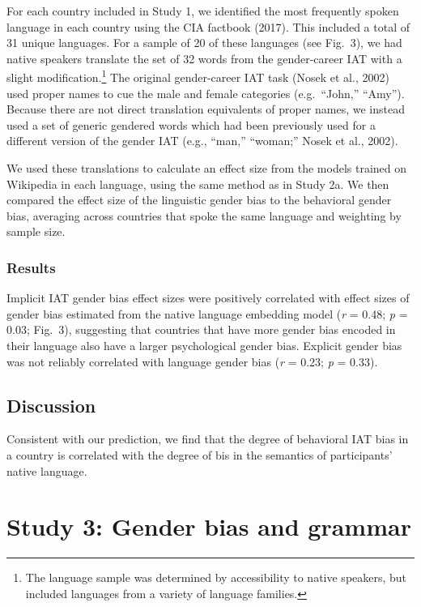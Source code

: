 \documentclass[10pt, letterpaper]{article}
\begin{document}
For each country included in Study 1, we identified the most frequently
spoken language in each country using the CIA factbook (2017). This
included a total of 31 unique languages. For a sample of 20 of these
languages (see Fig.~3), we had native speakers translate the set of 32
words from the gender-career IAT with a slight
modification.\footnote{The language sample was determined by accessibility to native speakers, but included languages from a variety of language families.}
The original gender-career IAT task (Nosek et al., 2002) used proper
names to cue the male and female categories (e.g.~``John,'' ``Amy'').
Because there are not direct translation equivalents of proper names, we
instead used a set of generic gendered words which had been previously
used for a different version of the gender IAT (e.g., ``man,''
``woman;'' Nosek et al., 2002).

We used these translations to calculate an effect size from the models
trained on Wikipedia in each language, using the same method as in Study
2a. We then compared the effect size of the linguistic gender bias to
the behavioral gender bias, averaging across countries that spoke the
same language and weighting by sample size.

\subsubsection{Results}\label{results-2}

Implicit IAT gender bias effect sizes were positively correlated with
effect sizes of gender bias estimated from the native language embedding
model (\emph{r} = 0.48; \emph{p} = 0.03; Fig.~3), suggesting that
countries that have more gender bias encoded in their language also have
a larger psychological gender bias. Explicit gender bias was not
reliably correlated with language gender bias (\emph{r} = 0.23; \emph{p}
= 0.33).

\subsection{Discussion}\label{discussion-1}

Consistent with our prediction, we find that the degree of behavioral
IAT bias in a country is correlated with the degree of bis in the
semantics of participants' native language.

\section{Study 3: Gender bias and
grammar}\label{study-3-gender-bias-and-grammar}
\end{document}
